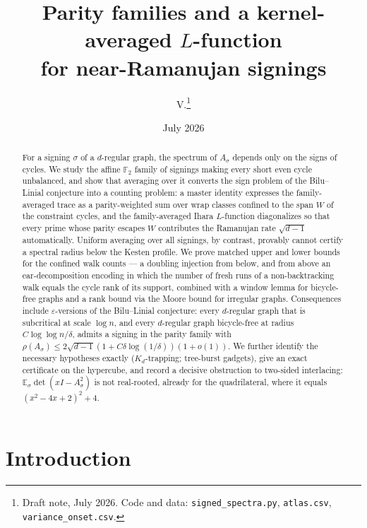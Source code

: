 \documentclass[11pt]{article}
\title{Parity families and a kernel-averaged $L$-function\\ for near-Ramanujan signings}
\author{V.\thanks{Draft note, July 2026. Code and data:
\texttt{signed\_spectra.py}, \texttt{atlas.csv}, \texttt{variance\_onset.csv}.}}
\date{July 2026}
\theoremstyle{remark}
\begin{document}
\maketitle

\begin{abstract}
For a signing $\sigma$ of a $d$-regular graph, the spectrum of
$A_\sigma$ depends only on the signs of cycles. We study the affine
$\mathbb F_2$ family of signings making every short even cycle
unbalanced, and show that averaging over it converts the sign problem
of the Bilu--Linial conjecture into a counting problem: a master
identity expresses the family-averaged trace as a parity-weighted sum
over wrap classes confined to the span $W$ of the constraint cycles,
and the family-averaged Ihara $L$-function diagonalizes so that every
prime whose parity escapes $W$ contributes the Ramanujan rate
$\sqrt{d-1}$ automatically. Uniform averaging over all signings, by
contrast, provably cannot certify a spectral radius below the Kesten
profile. We prove matched upper and lower bounds for the confined walk
counts --- a doubling injection from below, and from above an
ear-decomposition encoding in which the number of fresh runs of a
non-backtracking walk equals the cycle rank of its support, combined
with a window lemma for bicycle-free graphs and a rank bound via the
Moore bound for irregular graphs. Consequences include
$\varepsilon$-versions of the Bilu--Linial conjecture: every
$d$-regular graph that is subcritical at scale $\log n$, and every
$d$-regular graph bicycle-free at radius
$C\log\log n/\delta$, admits a signing in the parity family with
$\rho(A_\sigma)\le2\sqrt{d-1}(1+C\delta\log(1/\delta))(1+o(1))$. We
further identify the necessary hypotheses exactly ($K_d$-trapping;
tree-burst gadgets), give an exact certificate on the hypercube, and
record a decisive obstruction to two-sided interlacing:
$\mathbb E_\sigma\det(xI-A_\sigma^2)$ is not real-rooted, already for
the quadrilateral, where it equals $(x^2-4x+2)^2+4$.
\end{abstract}

\section{Introduction}
\end{document}
